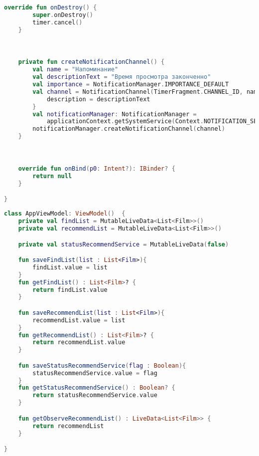 \begin{lstlisting}[language=Kotlin, caption=\leftline{TimerService}, label=lst:TimerService]
    override fun onDestroy() {
        super.onDestroy()
        timer.cancel()
    }



    private fun createNotificationChannel() {
        val name = "Напоминание"
        val descriptionText = "Время просмотра законченно"
        val importance = NotificationManager.IMPORTANCE_DEFAULT
        val channel = NotificationChannel(TimerFragment.CHANNEL_ID, name, importance).apply {
            description = descriptionText
        }
        val notificationManager: NotificationManager =
            applicationContext.getSystemService(Context.NOTIFICATION_SERVICE) as NotificationManager
        notificationManager.createNotificationChannel(channel)
    }



    override fun onBind(p0: Intent?): IBinder? {
        return null
    }

}
\end{lstlisting}

\begin{lstlisting}[language=Kotlin, caption=\leftline{AppViewModel}, label=lst:AppViewModel]
class AppViewModel: ViewModel()  {
    private val findList = MutableLiveData<List<Film>>()
    private val recommendList = MutableLiveData<List<Film>>()

    private val statusRecommendService = MutableLiveData(false)

    fun saveFindList(list : List<Film>){
        findList.value = list
    }
    fun getFindList() : List<Film>? {
        return findList.value
    }

    fun saveRecommendList(list : List<Film>){
        recommendList.value = list
    }
    fun getRecommendList() : List<Film>? {
        return recommendList.value
    }

    fun saveStatusRecommendService(flag : Boolean){
        statusRecommendService.value = flag
    }
    fun getStatusRecommendService() : Boolean? {
        return statusRecommendService.value
    }

    fun getObserveRecommendList() : LiveData<List<Film>> {
        return recommendList
    }

}
\end{lstlisting}